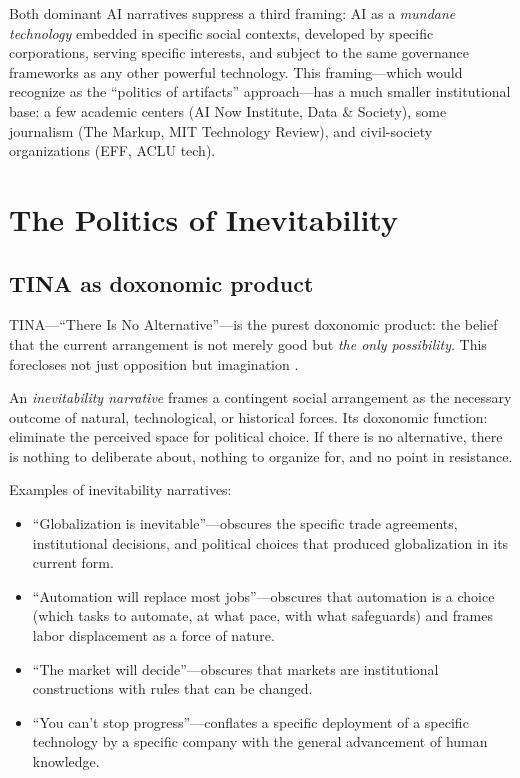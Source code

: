 Both dominant AI narratives suppress a third framing: AI as a \emph{mundane technology} embedded in specific social contexts, developed by specific corporations, serving specific interests, and subject to the same governance frameworks as any other powerful technology.
This framing---which \textcite{winner1986} would recognize as the ``politics of artifacts'' approach---has a much smaller institutional base: a few academic centers (AI Now Institute, Data \& Society), some journalism (The Markup, MIT Technology Review), and civil-society organizations (EFF, ACLU tech).

\section{The Politics of Inevitability}
\label{sec:ch28-inevitability}

\subsection{TINA as doxonomic product}

TINA---``There Is No Alternative''---is the purest doxonomic product: the belief that the current arrangement is not merely good but \emph{the only possibility}.
This forecloses not just opposition but imagination \autocite{brown2015, streeck2016}.

\begin{definition}
\label{def:inevitability}
An \emph{inevitability narrative} frames a contingent social arrangement as the necessary outcome of natural, technological, or historical forces.
Its doxonomic function: eliminate the perceived space for political choice.
If there is no alternative, there is nothing to deliberate about, nothing to organize for, and no point in resistance.
\end{definition}

Examples of inevitability narratives:
\begin{itemize}[nosep]
  \item ``Globalization is inevitable''---obscures the specific trade agreements, institutional decisions, and political choices that produced globalization in its current form.
  \item ``Automation will replace most jobs''---obscures that automation is a choice (which tasks to automate, at what pace, with what safeguards) and frames labor displacement as a force of nature.
  \item ``The market will decide''---obscures that markets are institutional constructions with rules that can be changed.
  \item ``You can't stop progress''---conflates a specific deployment of a specific technology by a specific company with the general advancement of human knowledge.
\end{itemize}

